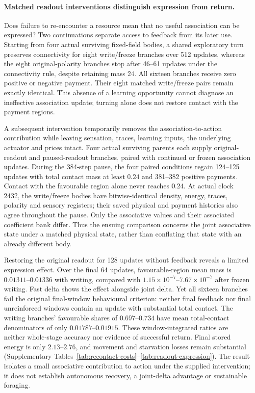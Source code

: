 
\FloatBarrier

\paragraph{Matched readout interventions distinguish expression from return.}

Does failure to re-encounter a resource mean that no useful association can be expressed? Two continuations separate access to feedback from its later use. Starting from four actual surviving fixed-field bodies, a shared exploratory turn preserves connectivity for eight write/freeze branches over 512 updates, whereas the eight original-polarity branches stop after 46--61 updates under the connectivity rule, despite retaining mass 24. All sixteen branches receive zero positive or negative payment. Their eight matched write/freeze pairs remain exactly identical. This absence of a learning opportunity cannot diagnose an ineffective association update; turning alone does not restore contact with the payment regions.

A subsequent intervention temporarily removes the association-to-action contribution while leaving sensation, traces, learning inputs, the underlying actuator and prices intact. Four actual surviving parents each supply original-readout and paused-readout branches, paired with continued or frozen association updates. During the 384-step pause, the four paired conditions regain 124--125 updates with total contact mass at least $0.24$ and 381--382 positive payments. Contact with the favourable region alone never reaches $0.24$. At actual clock 2432, the write/freeze bodies have bitwise-identical density, energy, traces, polarity and sensory registers; their saved physical and payment histories also agree throughout the pause. Only the associative values and their associated coefficient bank differ. Thus the ensuing comparison concerns the joint associative state under a matched physical state, rather than conflating that state with an already different body.

Restoring the original readout for 128 updates without feedback reveals a limited expression effect. Over the final 64 updates, favourable-region mean mass is $0.01311$--$0.01336$ with writing, compared with $1.15\times10^{-7}$--$7.67\times10^{-7}$ after frozen writing. Fast delta shows the effect alongside joint delta. Yet all sixteen branches fail the original final-window behavioural criterion: neither final feedback nor final unreinforced windows contain an update with substantial total contact. The writing branches' favourable shares of $0.697$--$0.734$ have mean total-contact denominators of only $0.01787$--$0.01915$. These window-integrated ratios are neither whole-stage accuracy nor evidence of successful return. Final stored energy is only $2.13$--$2.76$, and movement and starvation losses remain substantial (Supplementary Tables~\ref{tab:recontact-costs}--\ref{tab:readout-expression}). The result isolates a small associative contribution to action under the supplied intervention; it does not establish autonomous recovery, a joint-delta advantage or sustainable foraging.

